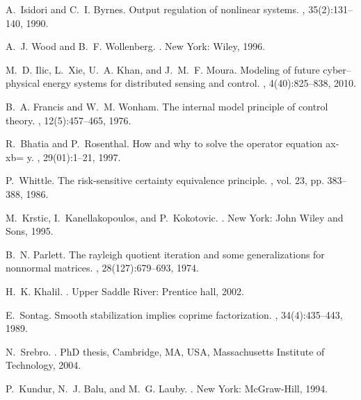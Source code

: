 \documentclass[journal]{IEEEtran}
\begin{document}
\begin{thebibliography}{10}
A.~Isidori and C.~I. Byrnes.
\newblock Output regulation of nonlinear systems.
, 35(2):131--140, 1990.

A.~J. Wood and B.~F. Wollenberg.
.
\newblock New York: Wiley, 1996.

M.~D. Ilic, L.~Xie, U.~A. Khan, and J.~M.~F. Moura.
\newblock Modeling of future cyber--physical energy systems for distributed
  sensing and control.
, 4(40):825--838, 2010.

B.~A. Francis and W.~M. Wonham.
\newblock The internal model principle of control theory.
, 12(5):457--465, 1976.

R.~Bhatia and P.~Rosenthal.
\newblock How and why to solve the operator equation ax- xb= y.
, 29(01):1--21,
  1997.

P.~Whittle.
\newblock The risk-sensitive certainty equivalence principle.
, vol. 23, pp. 383--388, 1986.

M.~Krstic, I.~Kanellakopoulos, and P.~Kokotovic.
.
\newblock New York: John Wiley and Sons, 1995.

B.~N. Parlett.
\newblock The rayleigh quotient iteration and some generalizations for
  nonnormal matrices.
, 28(127):679--693, 1974.

H.~K. Khalil.
.
\newblock Upper Saddle River: Prentice hall, 2002.

E.~Sontag.
\newblock Smooth stabilization implies coprime factorization.
, 34(4):435--443, 1989.

N.~Srebro.
.
\newblock PhD thesis, Cambridge, MA, USA,  Massachusetts Institute of Technology, 2004.

P.~Kundur, N.~J. Balu, and M.~G. Lauby.
.
\newblock New York: McGraw-Hill, 1994.


\end{thebibliography}
\end{document}
